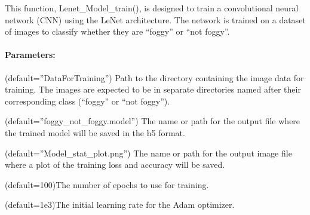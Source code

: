 \documentclass[letterpaper,10pt,english]{sphinxmanual}
\begin{document}
\begin{fulllineitems}
\label{\detokenize{akhdefo_functions:akhdefo_functions.Akhdefo_Tools.Lenet_Model_training}}
\pysigstartsignatures
{}
\pysigstopsignatures
\sphinxAtStartPar
This function, Lenet\_Model\_train(), is designed to train a convolutional neural network (CNN) using the LeNet architecture. The network is trained on a dataset of images to classify whether they are “foggy” or “not foggy”.


\paragraph{Parameters:}
\label{\detokenize{akhdefo_functions:id11}}\begin{description}
\sphinxAtStartPar
(default=”DataForTraining”) Path to the directory containing the image data for training. The images are expected to be in separate directories named after their corresponding class (“foggy” or “not foggy”).

\sphinxAtStartPar
(default=”foggy\_not\_foggy.model”) The name or path for the output file where the trained model will be saved in the h5 format.

\sphinxAtStartPar
(default=”Model\_stat\_plot.png”) The name or path for the output image file where a plot of the training loss and accuracy will be saved.

\sphinxAtStartPar
(default=100)The number of epochs to use for training.

\sphinxAtStartPar
(default=1e\sphinxhyphen{}3)The initial learning rate for the Adam optimizer.


\end{description}
\end{fulllineitems}
\end{document}
